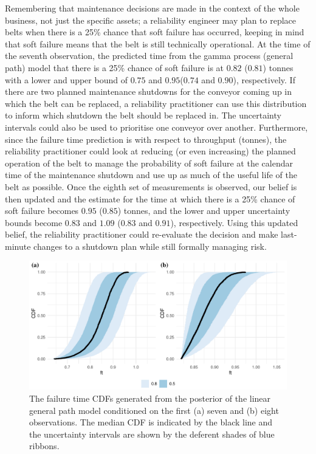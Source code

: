 Remembering that maintenance decisions are made in the context of the whole business, not just the specific assets; a reliability engineer may plan to replace belts when there is a 25\% chance that soft failure has occurred, keeping in mind that soft failure means that the belt is still technically operational. At the time of the seventh observation, the predicted time from the gamma process (general path) model that there is a 25\% chance of soft failure is at $0.82$ ($0.81$) tonnes with a lower and upper bound of $0.75$ and $0.95$($0.74$ and $0.90$), respectively. If there are two planned maintenance shutdowns for the conveyor coming up in which the belt can be replaced, a reliability practitioner can use this distribution to inform which shutdown the belt should be replaced in. The uncertainty intervals could also be used to prioritise one conveyor over another. Furthermore, since the failure time prediction is with respect to throughput (tonnes), the reliability practitioner could look at reducing (or even increasing) the planned operation of the belt to manage the probability of soft failure at the calendar time of the maintenance shutdown and use up as much of the useful life of the belt as possible. Once the eighth set of measurements is observed, our belief is then updated and the estimate for the time at which there is a 25\% chance of soft failure becomes $0.95$ ($0.85$) tonnes, and the lower and upper uncertainty bounds become $0.83$ and $1.09$ ($0.83$ and $0.91$), respectively. Using this updated belief, the reliability practitioner could re-evaluate the decision and make last-minute changes to a shutdown plan while still formally managing risk.

\begin{figure}
  \centering
  \includegraphics[width=\textwidth]{figures/ch-6/belt_wear_failuretime_CDF_lm.pdf}
  \caption{The failure time CDFs generated from the posterior of the linear general path model conditioned on the first (a) seven and (b) eight observations. The median CDF is indicated by the black line and the uncertainty intervals are shown by the deferent shades of blue ribbons.}
  \label{fig:beltwear-ft-lm}
\end{figure}

